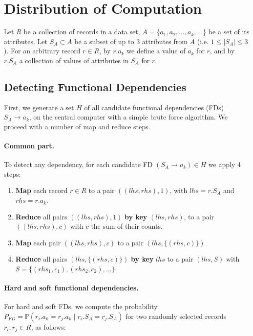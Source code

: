 \documentclass{article}
\begin{document}
\section{Distribution of Computation}\label{sec:distribution}
    
    Let $R$ be a collection of records in a data set, ${A = \{a_1, a_2, ..., a_k, ...\}}$ be a set of its attributes. Let $S_A \subset A$ be a subset of up to 3 attributes from $A$ (i.e. $1 \leq |S_A| \leq 3$). For an arbitrary record $r\in R$, by $r.a_k$ we define a value of $a_k$ for $r$, and by $r.S_A$ a collection of values of attributes in $S_A$ for $r$.
    
    \subsection{Detecting Functional Dependencies}\label{sec:detection}
    
    First, we generate a set $H$ of all candidate functional dependencies (FDs) $S_A \rightarrow a_k$, on the central computer with a simple brute force algorithm. We proceed with a number of map and reduce steps.
    
    \paragraph{Common part.} 
    To detect any dependency, for each candidate FD $(S_A \rightarrow a_k) \in H$ we apply 4 steps:
    \begin{enumerate}[noitemsep]
        \item \textbf{Map} each record $r \in R$ to a pair $((lhs, rhs), 1)$, with $lhs = r.S_A$ and $rhs=r.a_k$.
        
        \item \textbf{Reduce} all pairs $((lhs, rhs), 1)$ \textbf{by key} $(lhs, rhs)$, to a pair $((lhs, rhs), c)$ with $c$ the sum of their counts.
        
        \item \textbf{Map} each pair $((lhs, rhs), c)$ to a pair $(lhs, \{(rhs, c)\})$
        
        \item \textbf{Reduce} all pairs $(lhs, \{(rhs, c)\})$ \textbf{by key} $lhs$ to a pair $(lhs, S)$ with $S = \{(rhs_1, c_1), (rhs_2, c_2), ...\}$

    \end{enumerate}
    
    \paragraph{Hard and soft functional dependencies.}
    For hard and soft FDs, we compute the probability ${P_{FD} = \mathbb{P}(r_i.a_k = r_j.a_k \;|\; r_i.S_A = r_j.S_A)}$ for two randomly selected records $r_i, r_j \in R$, as follows:
    
\end{document}
